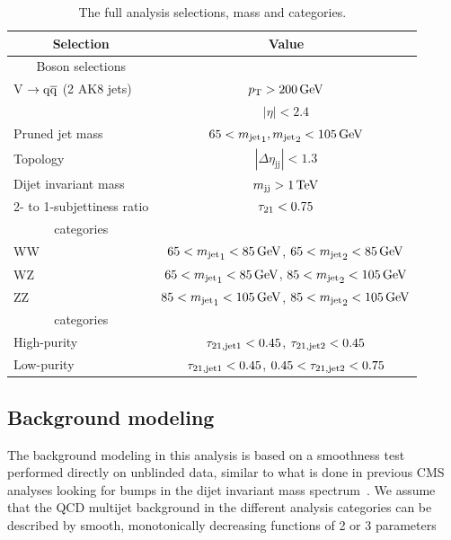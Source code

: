 \begin{table}[!h!]
\footnotesize
\begin{center}
\label{tab:search1:selection}
\renewcommand{\arraystretch}{1.2}
\begin{tabular}{lc}
\hline 
\multicolumn{1}{c}{Selection} & Value\\
\hline \hline
\multicolumn{1}{c}{Boson selections}\\
\cline{1-1}
V $\to\mathrm{q}\overline{\mathrm{q}}$ (2 AK8 jets) & $p_{\mathrm{T}} >200\,\text{Ge\hspace{-.08em}V}$\\
  & $|\eta| < 2.4$\\
Pruned jet mass & $65 < {m_{\text{jet}}}_1,{m_{\text{jet}}}_2  < 105\,\text{Ge\hspace{-.08em}V}$\\
Topology    & $|\Delta \eta_\mathrm{jj}| < 1.3$\\
Dijet invariant mass     & $m_\mathrm{jj} >1\,\text{Te\hspace{-.08em}V}$\\ 
2- to 1-subjettiness ratio    & $\tau_{21} < 0.75$\\
\hline
\multicolumn{1}{c}{\mJ{} categories}\\
\cline{1-1}
WW & $ 65 < {m_{\text{jet}}}_{1} < 85\,\text{Ge\hspace{-.08em}V}$, $ 65 < {m_{\text{jet}}}_{2} < 85\,\text{Ge\hspace{-.08em}V}$\\
WZ & $ 65 < {m_{\text{jet}}}_{1} < 85\,\text{Ge\hspace{-.08em}V}$, $ 85 < {m_{\text{jet}}}_{2} < 105\,\text{Ge\hspace{-.08em}V}$\\
ZZ & $ 85 < {m_{\text{jet}}}_{1} < 105\,\text{Ge\hspace{-.08em}V}$, $ 85 < {m_{\text{jet}}}_{2} < 105\,\text{Ge\hspace{-.08em}V}$\\
\hline
\multicolumn{1}{c}{\nsubj{} categories}\\
\cline{1-1}
High-purity   & $\tau_{\rm{21, jet1}} < 0.45$, $\tau_{\rm{21, jet2}} < 0.45$\\
Low-purity    & $\tau_{\rm{21, jet1}} < 0.45$, $0.45 < \tau_{\rm{21, jet2}} < 0.75$\\
\hline						       
\end{tabular}
\caption{The full analysis selections, mass and \nsubj categories.}
\end{center}
\end{table}


\clearpage
\subsection{Background modeling}
\label{sec:searchI:bkg}

The background modeling in this analysis is based on a smoothness test performed directly on unblinded data, similar to what is done in previous CMS analyses looking for bumps in the dijet invariant mass spectrum~\cite{Chatrchyan:2012ypy,CMS-PAS-EXO-12-059}. We assume that the QCD multijet background in the different analysis categories can be described by smooth, monotonically decreasing functions of 2 or 3 parameters

